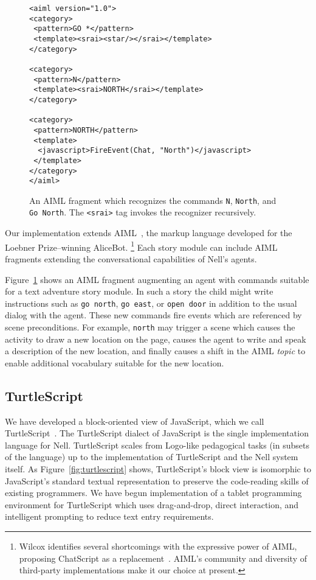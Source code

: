 \documentclass[preprint]{sig-alternate}
\begin{document}
\begin{figure}\small
\begin{verbatim}
<aiml version="1.0">
<category>
 <pattern>GO *</pattern>
 <template><srai><star/></srai></template>
</category>

<category>
 <pattern>N</pattern>
 <template><srai>NORTH</srai></template>
</category>

<category>
 <pattern>NORTH</pattern>
 <template>
  <javascript>FireEvent(Chat, "North")</javascript>
 </template>
</category>
</aiml>
\end{verbatim}
\caption{An AIML fragment which recognizes the commands \texttt{N},
  \texttt{North}, and \texttt{Go North}. The \texttt{<srai>} tag invokes the
  recognizer recursively.}\label{fig:aiml}
\end{figure}

Our implementation extends AIML~\cite{aiml:2005},
the markup language developed for the Loebner Prize--winning
AliceBot.%
\footnote{Wilcox identifies several shortcomings with the expressive
  power of AIML, proposing ChatScript as a
  replacement~\cite{wilcox:2010}.  AIML's community and
  diversity of third-party implementations make it our choice at present.}
Each story module can include AIML fragments extending the
conversational capabilities of Nell's agents.

Figure~\ref{fig:aiml}
shows an AIML fragment augmenting an agent with
commands suitable for a text adventure story module.
In such a story the child might write instructions such as
\texttt{go north}, \texttt{go east}, or \texttt{open door} in
addition to the usual dialog with the agent.
These new commands fire events which are referenced by scene
preconditions.  For example, \texttt{north} may
trigger a scene which causes the activity to draw a new location on
the page, causes the agent to write and speak a description of the new
location, and finally causes a shift in the AIML \textit{topic} to
enable additional vocabulary suitable for the new location.


\subsection{TurtleScript}\label{sec:turtles}

We have developed a block-oriented view of JavaScript, which we call
TurtleScript~\cite{turtlescript}.
The TurtleScript dialect of JavaScript is the single
implementation language for Nell.  TurtleScript scales from Logo-like
pedagogical tasks (in subsets of the language) up to the
implementation of TurtleScript and the
Nell system itself.  As Figure~\ref{fig:turtlescript} shows,
TurtleScript's block view is isomorphic to
JavaScript's standard textual
representation to preserve the code-reading skills of existing
programmers.  We have begun implementation of a
tablet programming environment for TurtleScript which uses
drag-and-drop, direct interaction, and intelligent prompting to reduce
text entry requirements.
\end{document}
